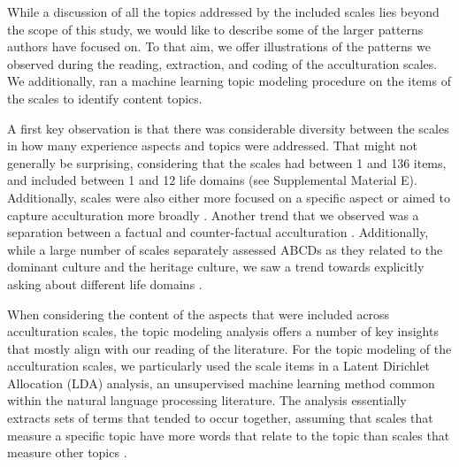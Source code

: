 While a discussion of all the topics addressed by the included scales
lies beyond the scope of this study, we would like to describe some of
the larger patterns authors have focused on. To that aim, we offer
illustrations of the patterns we observed during the reading,
extraction, and coding of the acculturation scales. We additionally, ran
a machine learning topic modeling procedure on the items of the scales
to identify content topics.

A first key observation is that there was considerable diversity between
the scales in how many experience aspects and topics were addressed.
That might not generally be surprising, considering that the scales had
between 1 and 136 items, and included between 1 and 12 life domains (see
Supplemental Material E). Additionally, scales were also either more
focused on a specific aspect
\citep[e.g., `Asian Value Scale';][]{Kim1999, Kim2004a} or aimed to
capture acculturation more broadly
\citep[e.g., `Asian American Multidimensional Acculturation Scale'][]{GimChung2004}.
Another trend that we observed was a separation between a factual and
counter-factual acculturation
\citep[e.g., real vs. ideal,][]{Navas2005, Navas2007, BenetMartinez2006}.
Additionally, while a large number of scales separately assessed ABCDs
as they related to the dominant culture and the heritage culture, we saw
a trend towards explicitly asking about different life domains
\citep[e.g., family, work, media;][also see Supplemental Material E]{Kim2010a, Arends-Toth2007, Mancini2014}.

When considering the content of the aspects that were included across
acculturation scales, the topic modeling analysis offers a number of key
insights that mostly align with our reading of the literature. For the
topic modeling of the acculturation scales, we particularly used the
scale items in a Latent Dirichlet Allocation (LDA) analysis, an
unsupervised machine learning method common within the natural language
processing literature. The analysis essentially extracts sets of terms
that tended to occur together, assuming that scales that measure a
specific topic have more words that relate to the topic than scales that
measure other topics
\citep[we followed the procedures outlined by][for a full methodological detail see Supplemental Material C]{Schweinberger2022}.

